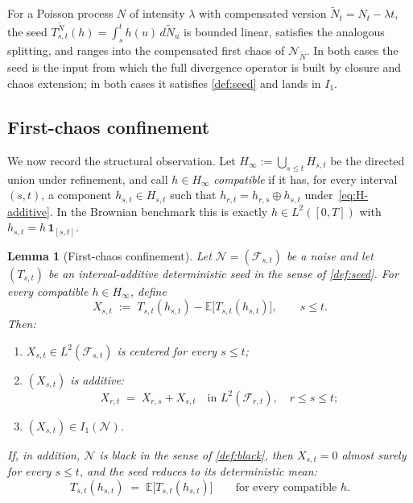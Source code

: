 \documentclass[11pt,reqno]{amsart}
\theoremstyle{plain}
\newtheorem{lemma}[theorem]{Lemma}
\theoremstyle{definition}
\theoremstyle{remark}
\newcommand{\E}{\mathbb{E}}
\begin{document}
For a Poisson process $N$ of intensity $\lambda$ with compensated
version $\widetilde N_t=N_t-\lambda t$, the seed
$T^{\widetilde N}_{s,t}(h)=\int_s^t h(u)\,d\widetilde N_u$ is bounded
linear, satisfies the analogous splitting, and ranges into the
compensated first chaos of $\mathcal N_{\widetilde N}$. In both
cases the seed is the input from which the full divergence operator
is built by closure and chaos extension; in both cases it satisfies
\cref{def:seed} and lands in $I_1$.

\subsection{First-chaos confinement}\label{sec:seed-lemma}

We now record the structural observation. Let
$H_\infty:=\bigcup_{s\le t}H_{s,t}$ be the directed union under
refinement, and call $h\in H_\infty$ \emph{compatible} if it has, for
every interval $(s,t)$, a component $h_{s,t}\in H_{s,t}$ such that
$h_{r,t}=h_{r,s}\oplus h_{s,t}$ under~\eqref{eq:H-additive}. In the
Brownian benchmark this is exactly $h\in L^2([0,T])$ with
$h_{s,t}=h\,\mathbf 1_{[s,t]}$.

\begin{lemma}[First-chaos confinement]\label{lem:seed}
Let $\mathcal N=(\mathcal F_{s,t})$ be a noise and let $(T_{s,t})$ be
an interval-additive deterministic seed in the sense of
\cref{def:seed}. For every compatible $h\in H_\infty$, define
\begin{equation}\label{eq:X-family}
  X_{s,t}\;:=\;T_{s,t}(h_{s,t})-\E\!\bigl[T_{s,t}(h_{s,t})\bigr],
  \qquad s\le t.
\end{equation}
Then:
\begin{enumerate}
\item[$(\mathrm i)$] $X_{s,t}\in L^2(\mathcal F_{s,t})$ is centered
for every $s\le t$;
\item[$(\mathrm{ii})$] $(X_{s,t})$ is additive:
\[
  X_{r,t}\;=\;X_{r,s}+X_{s,t}
  \quad\text{in }L^2(\mathcal F_{r,t}),\quad r\le s\le t;
\]
\item[$(\mathrm{iii})$] $(X_{s,t})\in I_1(\mathcal N)$.
\end{enumerate}
If, in addition, $\mathcal N$ is black in the sense of
\cref{def:black}, then $X_{s,t}=0$ almost surely for every $s\le t$,
and the seed reduces to its deterministic mean:
\begin{equation}\label{eq:seed-deterministic}
  T_{s,t}(h_{s,t})\;=\;\E\!\bigl[T_{s,t}(h_{s,t})\bigr]
  \qquad\text{for every compatible }h.
\end{equation}
\end{lemma}
\end{document}
